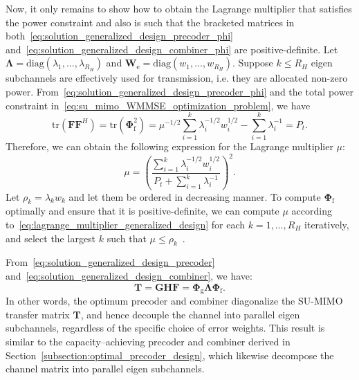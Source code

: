 Now, it only remains to show how to obtain the Lagrange multiplier that satisfies the power constraint and also is such that the bracketed matrices in both~\eqref{eq:solution_generalized_design_precoder_phi} and~\eqref{eq:solution_generalized_design_combiner_phi} are positive-definite.
Let $\mathbf{\Lambda} = \mathrm{diag}(\lambda_1, \dots, \lambda_{R_H})$ and $\mathbf{W}_{\mathrm{e}} = \mathrm{diag}(w_1, \dots, w_{R_H})$.
Suppose $k \leq R_H$ eigen subchannels are effectively used for transmission, i.e. they are allocated non-zero power.
From~\eqref{eq:solution_generalized_design_precoder_phi} and the total power constraint in~\eqref{eq:su_mimo_WMMSE_optimization_problem}, we have
\begin{equation}
\label{eq:power_constraint_generalized_design}
    \mathrm{tr}(\mathbf{F}\mathbf{F}^H) = \mathrm{tr}(\mathbf{\Phi}_{\mathrm{f}}^2) = \mu^{-1/2} \sum_{i=1}^k \lambda_i^{-1/2} w^{1/2}_i - \sum_{i=1}^k \lambda_i^{-1} = P_t.
\end{equation}
Therefore, we can obtain the following expression for the Lagrange multiplier $\mu$:
\begin{equation}
\label{eq:lagrange_multiplier_generalized_design}
    \mu = \left( \frac{\sum_{i=1}^k \lambda_i^{-1/2} w^{1/2}_i}{P_t + \sum_{i=1}^k \lambda_i^{-1}} \right)^2.
\end{equation}
Let $\rho_k = \lambda_k w_k$ and let them be ordered in decreasing manner. To compute $\mathbf{\Phi}_{\mathrm{f}}$ optimally and ensure that it is positive-definite, we can compute $\mu$ according to~\eqref{eq:lagrange_multiplier_generalized_design} for each $k = 1, \dots, R_H$ iteratively, and select the largest $k$ such that $\mu \leq \rho_k$~\cite{su_mimo_joint_precoder_decoder_design}.


From~\eqref{eq:solution_generalized_design_precoder} and~\eqref{eq:solution_generalized_design_combiner}, we have:
\begin{equation}
\label{eq:diagonalization_transfer_matrix_generalized_design}
    \mathbf{T} = \mathbf{G}\mathbf{H}\mathbf{F} = \mathbf{\Phi}_{\mathrm{g}} \mathbf{\Lambda} \mathbf{\Phi}_{\mathrm{f}}.
\end{equation}
In other words, the optimum precoder and combiner diagonalize the \ac{SU}-\ac{MIMO} transfer matrix $\mathbf{T}$, and hence decouple the channel into parallel eigen subchannels, regardless of the specific choice of error weights.
This result is similar to the capacity--achieving precoder and combiner derived in Section~\ref{subsection:optimal_precoder_design}, which likewise decompose the channel matrix into parallel eigen subchannels.

